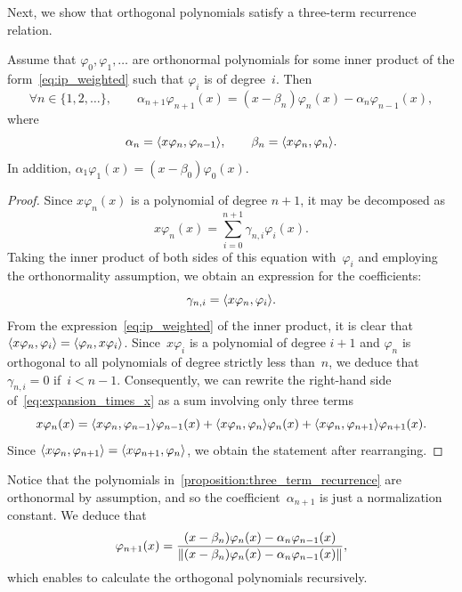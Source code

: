 Next, we show that orthogonal polynomials satisfy a three-term recurrence relation.
\begin{proposition}
    \label{proposition:three_term_recurrence}
    Assume that $\varphi_0, \varphi_1, \dotsc$ are orthonormal polynomials
    for some inner product of the form~\eqref{eq:ip_weighted} such that $\varphi_i$ is of degree~$i$.
    Then
    \begin{equation}
        \label{eq:recurrence_ortho}
        \forall n \in \{1, 2, \dotsc\}, \qquad
        \alpha_{n+1} \varphi_{n+1} (x) = (x - \beta_n) \varphi_n(x) - \alpha_{n} \varphi_{n-1}(x),
    \end{equation}
    where
    \[
        \alpha_n = \ip[big]{x \varphi_n, \varphi_{n-1}},
        \qquad \beta_n = \ip[big]{x \varphi_n, \varphi_{n}}.
    \]
    In addition, $\alpha_1 \varphi_{1} (x) = (x - \beta_0) \varphi_0(x)$.
\end{proposition}
\begin{proof}
    Since $x \varphi_n(x)$ is a polynomial of degree $n+1$,
    it may be decomposed as
    \begin{equation}
        \label{eq:expansion_times_x}
        x \varphi_n(x) = \sum_{i=0}^{n+1} \gamma_{n,i} \varphi_i(x).
    \end{equation}
    Taking the inner product of both sides of this equation with~$\varphi_i$
    and employing the orthonormality assumption,
    we obtain an expression for the coefficients:
    \[
        \gamma_{n,i} = \ip[big]{x \varphi_n, \varphi_i}.
    \]
    From the expression~\eqref{eq:ip_weighted} of the inner product,
    it is clear that $\ip[big]{x \varphi_n, \varphi_i} = \ip[big]{\varphi_n, x\varphi_i}$.
    Since~$x \varphi_i$ is a polynomial of degree $i+1$ and $\varphi_n$ is orthogonal to all polynomials of degree strictly less than~$n$,
    we deduce that $\gamma_{n,i} = 0$ if~$i < n-1$.
    Consequently, we can rewrite the right-hand side of~\eqref{eq:expansion_times_x} as a sum involving only three terms
    \begin{equation}
        \label{eq:expansion_times_x_good}
        x \varphi_n(x) =  \ip[big]{x \varphi_n, \varphi_{n-1}} \varphi_{n-1}(x) + \ip[big]{x \varphi_n, \varphi_{n}} \varphi_{n}(x) + \ip[big]{x \varphi_n, \varphi_{n+1}} \varphi_{n+1}(x).
    \end{equation}
    Since $\ip[big]{x \varphi_n, \varphi_{n+1}} = \ip[big]{x \varphi_{n+1}, \varphi_{n}}$,
    we obtain the statement after rearranging.
\end{proof}
\begin{remark}
    Notice that the polynomials in~\cref{proposition:three_term_recurrence} are orthonormal by assumption,
    and so the coefficient~$\alpha_{n+1}$ is just a normalization constant.
    We deduce that
    \[
        \varphi_{n+1} (x) = \frac{(x - \beta_n) \varphi_n(x) - \alpha_{n} \varphi_{n-1}(x)}{\lVert(x - \beta_n) \varphi_n(x) - \alpha_{n} \varphi_{n-1}(x)\rVert},
    \]
    which enables to calculate the orthogonal polynomials recursively.
\end{remark}

